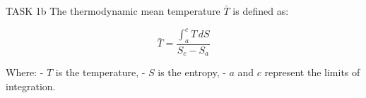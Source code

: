TASK 1b  
The thermodynamic mean temperature \( \bar{T} \) is defined as:  

\[
\bar{T} = \frac{\int_a^c T \, dS}{S_c - S_a}
\]  

Where:  
- \( T \) is the temperature,  
- \( S \) is the entropy,  
- \( a \) and \( c \) represent the limits of integration.